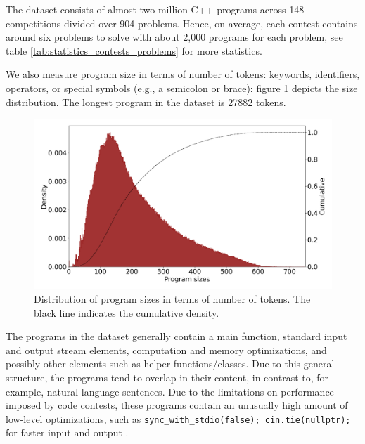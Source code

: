 The dataset consists of almost two million C++ programs across 148 competitions divided over 904 problems. 
Hence, on average, each contest contains around six problems to solve with about 2,000 programs for each problem, see table \ref{tab:statistics_contests_problems} for more statistics. 

\begin{table}
\centering

\label{tab:statistics_contests_problems}
\endgroup
\end{table}

We also measure program size in terms of number of tokens: keywords, identifiers, operators, or special symbols (e.g., a semicolon or brace): figure \ref{fig:program_sizes}
 depicts the size distribution. 
 The longest program in the dataset is 27882 tokens.

\begin{figure}
    \centering
    \includegraphics[width=\linewidth]{images/program_sizes.png}
    \caption[Distribution of program sizes]{Distribution of program sizes in terms of number of tokens. The black line indicates the cumulative density.}
    \label{fig:program_sizes}
\end{figure}

The programs in the dataset generally contain a main function, standard input and output stream elements, computation and memory optimizations, and possibly other elements such as helper functions/classes. Due to this general structure, the programs tend to overlap in their content, in contrast to, for example, natural language sentences. 
Due to the limitations on performance imposed by code contests, these programs contain an unusually high amount of low-level optimizations, such as \verb|sync_with_stdio(false); cin.tie(nullptr);| for faster input and output \cite{FastInputOutput}.

